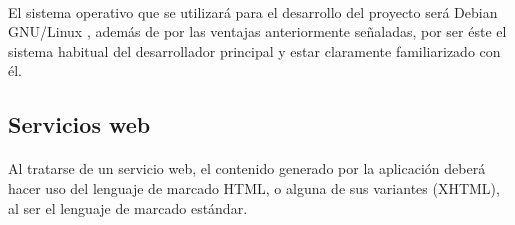    \paragraph{} El sistema operativo que se utilizará para el desarrollo del
   proyecto será Debian GNU/Linux \cite{debian}, además de por las ventajas
   anteriormente señaladas, por ser éste el sistema habitual del desarrollador
   principal y estar claramente familiarizado con él.

\subsection{Servicios web}
   \paragraph{} Al tratarse de un servicio web, el contenido generado por la
   aplicación deberá hacer uso del lenguaje de marcado HTML, o alguna de sus
   variantes (XHTML), al ser el lenguaje de marcado estándar.


